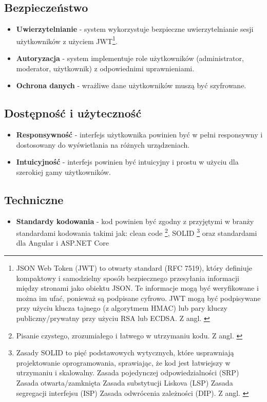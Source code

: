 \subsection{Bezpieczeństwo}
\begin{itemize}
	\item \textbf{Uwierzytelnianie} - system wykorzystuje bezpieczne uwierzytelnianie sesji użytkowników z użyciem JWT\footnote{JSON Web Token (JWT) to otwarty standard (RFC 7519), który definiuje kompaktowy i samodzielny sposób bezpiecznego przesyłania informacji między stronami jako obiektu JSON. Te informacje mogą być weryfikowane i można im ufać, ponieważ są podpisane cyfrowo. JWT mogą być podpisywane przy użyciu klucza tajnego (z algorytmem HMAC) lub pary kluczy publiczny/prywatny przy użyciu RSA lub ECDSA. Z angl. \cite{jwt.io}}.
	\item \textbf{Autoryzacja} - system implementuje role użytkowników (administrator, moderator, użytkownik) z odpowiednimi uprawnieniami.
	\item \textbf{Ochrona danych} - wrażliwe dane użytkowników muszą być szyfrowane.
\end{itemize}

\subsection{Dostępność i użyteczność}
\begin{itemize}
	\item \textbf{Responsywność} - interfejs użytkownika powinien być w pełni responsywny i dostosowany do wyświetlania na różnych urządzeniach.
	\item \textbf{Intuicyjność} - interfejs powinien być intuicyjny i prostu w użyciu dla szerokiej gamy użytkowników.
\end{itemize}

\subsection{Techniczne}
\begin{itemize}
	\item \textbf{Standardy kodowania} - kod powinien być zgodny z przyjętymi w branży standardami kodowania takimi jak: clean code
	\footnote{Pisanie czystego, zrozumiałego i łatwego w utrzymaniu kodu. Z angl. \cite{freecodecamp.cleancode} \cite{theartofclieancode}}, SOLID
	\footnote{Zasady SOLID to pięć podstawowych wytycznych, które usprawniają projektowanie oprogramowania, sprawiając, że kod jest łatwiejszy w utrzymaniu i skalowalny. Zasada pojedynczej odpowiedzialności (SRP) Zasada otwarta/zamknięta Zasada substytucji Liskova (LSP) Zasada segregacji interfejsu (ISP) Zasada odwrócenia zależności (DIP). Z angl. \cite{geeksforgeeks.solid}}
	oraz standardami dla Angular \cite{Angular_17_Documentation} i ASP.NET Core \cite{ASP.NET_Core_Documentation}
\end{itemize}

